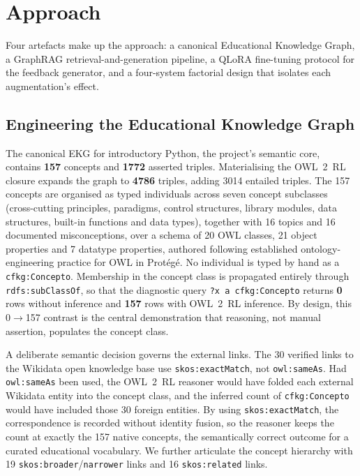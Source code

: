 \documentclass[sageh]{sagej}
\begin{document}
\section{Approach}
Four artefacts make up the approach: a canonical Educational Knowledge Graph, a GraphRAG retrieval-and-generation pipeline, a QLoRA fine-tuning protocol for the feedback generator, and a four-system factorial design that isolates each augmentation's effect.

\subsection{Engineering the Educational Knowledge Graph}
The canonical EKG for introductory Python, the project's semantic core, contains \textbf{157} concepts and \textbf{1772} asserted triples. Materialising the OWL~2~RL closure expands the graph to \textbf{4786} triples, adding 3014 entailed triples. The 157 concepts are organised as typed individuals across seven concept subclasses (cross-cutting principles, paradigms, control structures, library modules, data structures, built-in functions and data types), together with 16 topics and 16 documented misconceptions, over a schema of 20 OWL classes, 21 object properties and 7 datatype properties, authored following established ontology-engineering practice for OWL in Prot\'eg\'e.\cite{debellis2021protege} No individual is typed by hand as a \texttt{cfkg:Concepto}. Membership in the concept class is propagated entirely through \texttt{rdfs:subClassOf}, so that the diagnostic query \texttt{?x a cfkg:Concepto} returns \textbf{0} rows without inference and \textbf{157} rows with OWL~2~RL inference. By design, this 0$\rightarrow$157 contrast is the central demonstration that reasoning, not manual assertion, populates the concept class.

A deliberate semantic decision governs the external links. The 30 verified links to the Wikidata open knowledge base\cite{vrandecic2014wikidata} use \texttt{skos:exactMatch}, not \texttt{owl:sameAs}. Had \texttt{owl:sameAs} been used, the OWL~2~RL reasoner would have folded each external Wikidata entity into the concept class, and the inferred count of \texttt{cfkg:Concepto} would have included those 30 foreign entities. By using \texttt{skos:exactMatch}, the correspondence is recorded without identity fusion, so the reasoner keeps the count at exactly the 157 native concepts, the semantically correct outcome for a curated educational vocabulary. We further articulate the concept hierarchy with 19 \texttt{skos:broader}/\texttt{narrower} links and 16 \texttt{skos:related} links.
\end{document}
